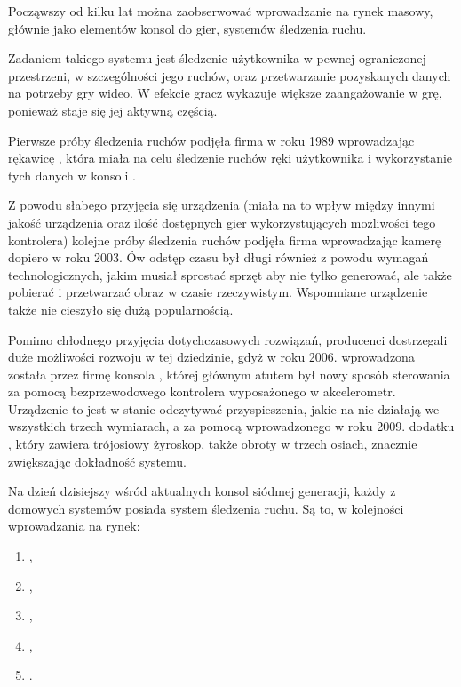 \label{ch:current_state} %

Począwszy od kilku lat można zaobserwować wprowadzanie na rynek masowy, głównie jako elementów konsol do gier, systemów śledzenia ruchu.

Zadaniem takiego systemu jest śledzenie użytkownika w pewnej ograniczonej przestrzeni, w szczególności jego ruchów, oraz przetwarzanie pozyskanych danych na potrzeby gry wideo. W efekcie gracz wykazuje większe zaangażowanie w grę, ponieważ staje się jej aktywną częścią.

Pierwsze próby śledzenia ruchów podjęła firma  w roku 1989 wprowadzając rękawicę , która miała na celu śledzenie ruchów ręki użytkownika i wykorzystanie tych danych w konsoli .

Z powodu słabego przyjęcia się urządzenia (miała na to wpływ między innymi jakość urządzenia oraz ilość dostępnych gier wykorzystujących możliwości tego kontrolera) kolejne próby śledzenia ruchów podjęła firma  wprowadzając kamerę  dopiero w roku 2003. Ów odstęp czasu był długi również z powodu wymagań technologicznych, jakim musiał sprostać sprzęt aby nie tylko generować, ale także pobierać i przetwarzać obraz w czasie rzeczywistym. Wspomniane urządzenie także nie cieszyło się dużą popularnością.

Pomimo chłodnego przyjęcia dotychczasowych rozwiązań, producenci dostrzegali duże możliwości rozwoju w tej dziedzinie, gdyż w roku 2006. wprowadzona została przez firmę  konsola , której głównym atutem był nowy sposób sterowania \ppauza za pomocą bezprzewodowego kontrolera wyposażonego w akcelerometr. Urządzenie to jest w stanie odczytywać przyspieszenia, jakie na nie działają we wszystkich trzech wymiarach, a za pomocą wprowadzonego w roku 2009. dodatku , który zawiera trójosiowy żyroskop, także obroty w trzech osiach, znacznie zwiększając dokładność systemu.

Na dzień dzisiejszy wśród aktualnych konsol siódmej generacji, każdy z domowych systemów posiada system śledzenia ruchu. Są to, w kolejności wprowadzania na rynek:
\begin{enumerate}
 \item {} \ppauza {},
 \item {} \ppauza {},
 \item {} \ppauza {},
 \item {} \ppauza {},
 \item {} \ppauza {}.
\end{enumerate}


